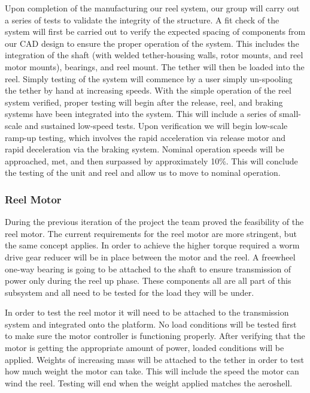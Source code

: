 Upon completion of the manufacturing our reel system, our group will carry out a series of tests to validate the integrity of the structure. A fit check of the system will first be carried out to verify the expected spacing of components from our CAD design to ensure the proper operation of the system. This includes the integration of the shaft (with welded tether-housing walls, rotor mounts, and reel motor mounts), bearings, and reel mount. The tether will then be loaded into the reel. Simply testing of the system will commence by a user simply un-spooling the tether by hand at increasing speeds. With the simple operation of the reel system verified, proper testing will begin after the release, reel, and braking systems have been integrated into the system. This will include a series of small-scale and sustained low-speed tests. Upon verification we will begin low-scale ramp-up testing, which involves the rapid acceleration via release motor and rapid deceleration via the braking system. Nominal operation speeds will be approached, met, and then surpassed by approximately 10\%. This will conclude the testing of the unit and reel and allow us to move to nominal operation. 


\subsubsection{Reel Motor}

\indent\indent During the previous iteration of the project the team proved the feasibility of the reel motor. The current requirements for the reel motor are more stringent, but the same concept applies. In order to achieve the higher torque required a worm drive gear reducer will be in place between the motor and the reel. A freewheel one-way bearing is going to be attached to the shaft to ensure transmission of power only during the reel up phase. These components all are all part of this subsystem and all need to be tested for the load they will be under.

\indent\indent In order to test the reel motor it will need to be attached to the transmission system and integrated onto the platform. No load conditions will be tested first to make sure the motor controller is functioning properly. After verifying that the motor is getting the appropriate amount of power, loaded conditions will be applied. Weights of increasing mass will be attached to the tether in order to test how much weight the motor can take. This will include the speed the motor can wind the reel. Testing will end when the weight applied matches the aeroshell. 

